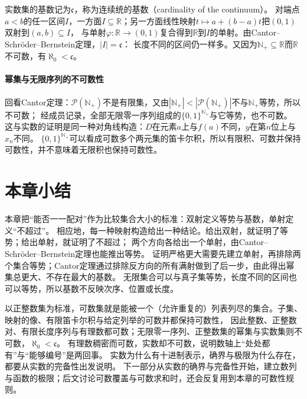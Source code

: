 实数集的基数记为$\mathfrak c$，称为连续统的基数（cardinality of the continuum）。
对端点$a<b$的任一区间$I$，一方面$I\subseteq\mathbb R$；另一方面线性映射$t\mapsto a+(b-a)t$把$(0,1)$双射到$(a,b)\subseteq I$，
与单射$\varphi:\mathbb R\to(0,1)$复合得到$\mathbb R$到$I$的单射。由Cantor--Schröder--Bernstein定理，$|I|=\mathfrak c$：
长度不同的区间仍一样多。又因为$\mathbb N_+\subseteq\mathbb R$而$\mathbb R$不可数，有$\aleph_0<\mathfrak c$。

\paragraph{幂集与无限序列的不可数性}
\label{sec:comb-uncountable-power-set}
回看Cantor定理：$\mathcal P(\mathbb N_+)$不是有限集，又由$|\mathbb N_+|<|\mathcal P(\mathbb N_+)|$不与$\mathbb N_+$等势，所以不可数；
经成员记录，全部无限零一序列组成的$\{0,1\}^{\mathbb N_+}$与它等势，也不可数。
这与实数的证明是同一种对角线构造：$D$在元素$a$上与$f(a)$不同，$y$在第$n$位上与$x_n$不同。
$\{0,1\}^{\mathbb N_+}$可以看成可数多个两元集的笛卡尔积，所以有限积、可数并保持可数性，并不意味着无限积也保持可数性。

\section{本章小结}
\label{sec:cardinality-summary}

本章把“能否一一配对”作为比较集合大小的标准：双射定义等势与基数，单射定义“不超过”。
相应地，每一种映射构造给出一种结论。给出双射，就证明了等势；给出单射，就证明了不超过；
两个方向各给出一个单射，由Cantor--Schröder--Bernstein定理也能推出等势。
证明严格更大需要先建立单射，再排除两个集合等势；Cantor定理通过排除反方向的所有满射做到了后一步，由此得出幂集总更大、不存在最大的基数。
无限集合可以与真子集等势，长度不同的区间也可以等势，所以基数不反映次序、位置或长度。

以正整数集为标准，可数集就是能被一个（允许重复的）列表列尽的集合。子集、映射的像、有限笛卡尔积与给定列举的可数并都保持可数性，
因此整数、正整数对、有限长度序列与有理数都可数；无限零一序列、正整数集的幂集与实数集则不可数，$\aleph_0<\mathfrak c$。
有理数稠密而可数，实数却不可数，说明数轴上“处处都有”与“能够编号”是两回事。
实数为什么有十进制表示，确界与极限为什么存在，都要从实数的完备性出发说明。
下一部分从实数的确界与完备性开始，建立数列与函数的极限；后文讨论可数覆盖与可数求和时，还会反复用到本章的可数性规则。
